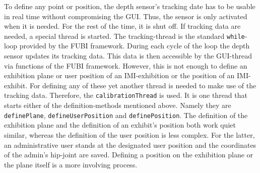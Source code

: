 To define any point or position, the depth sensor's tracking date has to be usable in real time without compromising the \ac{GUI}. Thus, the sensor is only activated when it is needed. For the rest of the time, it is shut off. If tracking data are needed, a special thread is started. The tracking-thread is the standard \texttt{while}-loop provided by the \ac{FUBI} framework. During each cycle of the loop the depth sensor updates its tracking data. This data is then accessible by the \ac{GUI}-thread via functions of the \ac{FUBI} framework. However, this is not enough to define an exhibition plane or user position of an \ac{IMI}-exhibition or the position of an \ac{IMI}-exhibit. For defining any of these yet another thread is needed to make use of the tracking data. Therefore, the \texttt{calibrationThread} is used. It is one thread that starts either of the definition-methods mentioned above. Namely they are \texttt{definePlane}, \texttt{defineUserPosition} and \texttt{definePosition}. The definition of the exhibition plane and the definition of an exhibit's position both work quiet similar, whereas the definition of the user position is less complex. For the latter, an administrative user stands at the designated user position and the coordinates of the admin's hip-joint are saved. Defining a position on the exhibition plane or the plane itself is a more involving process.
\\
